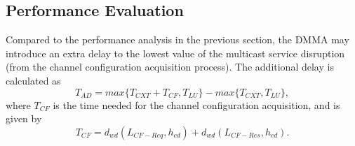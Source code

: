 \subsection{Performance Evaluation}
Compared to the performance analysis in the previous section, the DMMA may introduce an extra delay to the lowest value of the multicast service disruption (from the channel configuration acquisition process). The additional delay is calculated as \\
\begin{equation}
T_{AD} = max \lbrace T_{CXT} + T_{CF}, T_{LU} \rbrace - max \lbrace T_{CXT}, T_{LU} \rbrace,
\end{equation}
where $T_{CF}$ is the time needed for the channel configuration acquisition, and is given by\\
\begin{equation}
T_{CF} = d_{wd}(L_{CF-Req}, h_{cd}) + d_{wd}(L_{CF-Res}, h_{cd}).
\end{equation}


